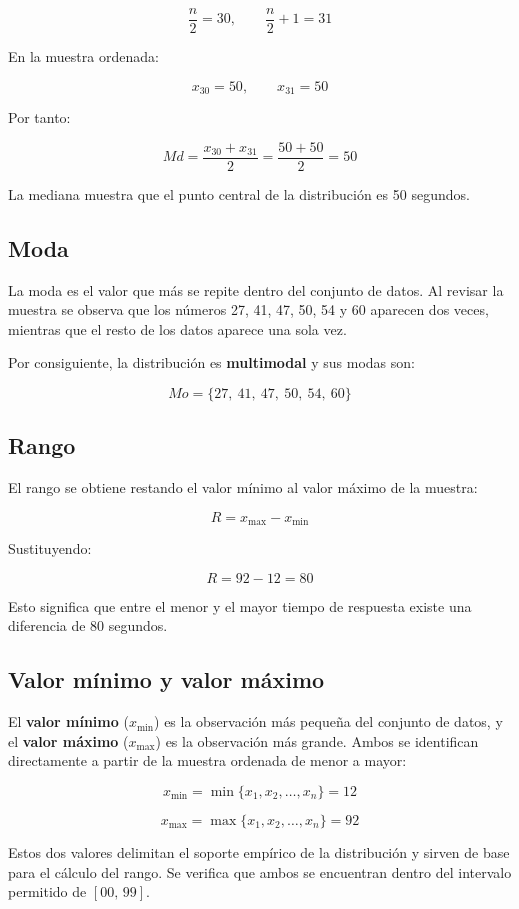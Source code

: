 \documentclass[12pt,letterpaper]{article}
\begin{document}
\[
\frac{n}{2}=30, \qquad \frac{n}{2}+1=31
\]

En la muestra ordenada:

\[
x_{30}=50,\qquad x_{31}=50
\]

Por tanto:

\[
Md=\frac{x_{30}+x_{31}}{2}=\frac{50+50}{2}=50
\]

La mediana muestra que el punto central de la distribución es 50 segundos.

\subsection{Moda}

La moda es el valor que más se repite dentro del conjunto de datos. Al revisar la muestra se observa que los números 27, 41, 47, 50, 54 y 60 aparecen dos veces, mientras que el resto de los datos aparece una sola vez.

Por consiguiente, la distribución es \textbf{multimodal} y sus modas son:

\[
Mo=\{27,\ 41,\ 47,\ 50,\ 54,\ 60\}
\]

\subsection{Rango}

El rango se obtiene restando el valor mínimo al valor máximo de la muestra:

\[
R=x_{\max}-x_{\min}
\]

Sustituyendo:

\[
R=92-12=80
\]

Esto significa que entre el menor y el mayor tiempo de respuesta existe una diferencia de 80 segundos.

\subsection{Valor mínimo y valor máximo}

El \textbf{valor mínimo} ($x_{\min}$) es la observación más pequeña del conjunto de datos, y el \textbf{valor máximo} ($x_{\max}$) es la observación más grande. Ambos se identifican directamente a partir de la muestra ordenada de menor a mayor:

\[
x_{\min} = \min\{x_1, x_2, \ldots, x_n\} = 12
\]

\[
x_{\max} = \max\{x_1, x_2, \ldots, x_n\} = 92
\]

Estos dos valores delimitan el soporte empírico de la distribución y sirven de base para el cálculo del rango. Se verifica que ambos se encuentran dentro del intervalo permitido de $[00,\, 99]$.
\end{document}
